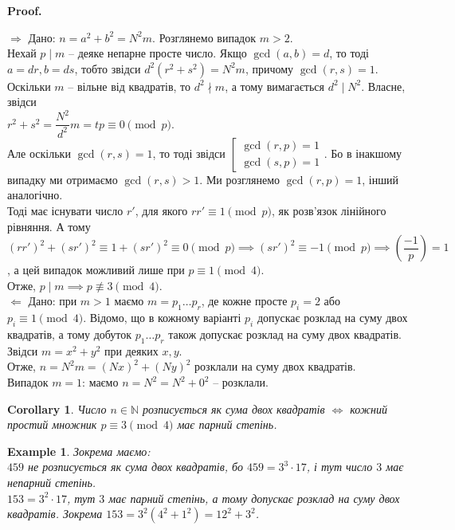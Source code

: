 \documentclass[a4paper, 14pt]{extarticle}
\makeatletter
\theoremstyle{theoremdd}
\theoremstyle{theoremdd}
\theoremstyle{theoremdd}
\theoremstyle{theoremdd}
\newtheorem{example}[theorem]{Example}
\theoremstyle{theoremdd}
\theoremstyle{theoremdd}
\theoremstyle{theoremdd}
\theoremstyle{theoremdd}
\newtheorem{corollary}[theorem]{Corollary}
\def\qed{$\blacksquare$}
\def\rightproof{$\boxed{\Rightarrow}$ }
\def\leftproof{$\boxed{\Leftarrow}$ }
\renewenvironment{proof}[1][Proof.\\]{\par
\pushQED{\hfill \qed}%
\normalfont \topsep6\p@\@plus6\p@\relax
\trivlist
\item\relax
{\bfseries
#1\@addpunct{.}}\hspace\labelsep\ignorespaces
}{%
\popQED\endtrivlist\@endpefalse
}
\makeatother
\begin{document}
\begin{proof}
\rightproof Дано: $n = a^2+b^2 = N^2m$. Розглянемо випадок $m > 2$.\\
Нехай $p \mid m$ -- деяке непарне просте число. Якщо $\gcd(a,b) = d$, то тоді $a = dr, b = ds$, тобто звідси $d^2(r^2+s^2) = N^2m$, причому $\gcd(r,s)=1$.\\
Оскільки $m$ -- вільне від квадратів, то $d^2 \nmid m$, а тому вимагається $d^2 \mid N^2$. Власне, звідси\\
$r^2+s^2 = \dfrac{N^2}{d^2}m = tp \equiv 0 \pmod p$.\\
Але оскільки $\gcd(r,s) = 1$, то тоді звідси $\left[ \begin{gathered} \gcd(r,p)=1 \\ \gcd(s,p)=1 \end{gathered} \right.$. Бо в інакшому випадку ми отримаємо $\gcd(r,s) > 1$. Ми розглянемо $\gcd(r,p) = 1$, інший аналогічно.\\
Тоді має існувати число $r'$, для якого $rr' \equiv 1 \pmod p$, як розв'язок лінійного рівняння. А тому\\
$(rr')^2 + (sr')^2 \equiv 1 + (sr')^2 \equiv 0 \pmod p \implies (sr')^2 \equiv -1 \pmod p \implies \left( \dfrac{-1}{p} \right) = 1$, а цей випадок можливий лише при $p \equiv 1 \pmod 4$.\\
Отже, $p \mid m \implies p \not\equiv 3 \pmod 4$.
\bigskip \\
\leftproof Дано: при $m > 1$ маємо $m = p_1 \dots p_r$, де кожне просте $p_i = 2$ або $p_i \equiv 1 \pmod 4$. Відомо, що в кожному варіанті $p_i$ допускає розклад на суму двох квадратів, а тому добуток $p_1 \dots p_r$ також допускає розклад на суму двох квадратів. Звідси $m = x^2+y^2$ при деяких $x,y$.\\
Отже, $n = N^2m = (Nx)^2 + (Ny)^2$ розклали на суму двох квадратів.\\
Випадок $m = 1$: маємо $n = N^2 = N^2 + 0^2$ -- розклали.
\end{proof}

\begin{corollary}
Число $n \in \mathbb{N}$ розписується як сума двох квадратів $\iff$ кожний простий множник $p \equiv 3 \pmod 4$ має парний степінь.
\end{corollary}

\begin{example}
Зокрема маємо:\\
$459$ не розписується як сума двох квадратів, бо $459 = 3^3 \cdot 17$, і тут число $3$ має непарний степінь.\\
$153 = 3^2 \cdot 17$, тут $3$ має парний степінь, а тому допускає розклад на суму двох квадратів. Зокрема $153 = 3^2 (4^2+1^2) = 12^2 + 3^2$. 
\end{example}
\end{document}
